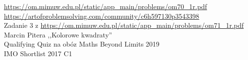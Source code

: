
 \url{https://om.mimuw.edu.pl/static/app_main/problems/om70_1r.pdf} \\
 \url{https://artofproblemsolving.com/community/c6h597130p3543398} \\
 Zadanie 3 z \url{https://om.mimuw.edu.pl/static/app_main/problems/om71_1r.pdf} \\
 Marcin Pitera ,,Kolorowe kwadraty'' \\
 Qualifying Quiz na obóz Maths Beyond Limits 2019 \\
 IMO Shortlist 2017 C1 \\
